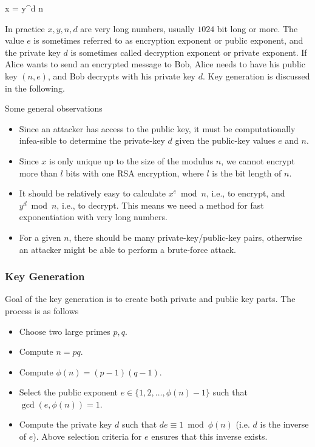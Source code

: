 \bee
x = y^d \bmod n
\eee

In practice $x, y, n, d$ are very long numbers, usually $1024$ bit long or more. The value $e$ is sometimes referred to as encryption exponent or public exponent, and the private key $d$ is sometimes called decryption exponent or private exponent. If Alice wants to send an encrypted message to Bob, Alice needs to have his public key $(n, e)$, and Bob decrypts with his private key $d$. Key generation is discussed in the following.

Some general observations

\begin{itemize}

\item Since an attacker has access to the public key, it must be computationally infea-sible to determine the private-key $d$ given the public-key values $e$ and $n$. 

\item Since $x$ is only unique up to the size of the modulus $n$, we cannot encrypt more than $l$ bits with one RSA encryption, where $l$ is the bit length of $n$.

\item It should be relatively easy to calculate $x^ e \bmod n$, i.e., to encrypt, and $y^d \bmod n$, i.e., to decrypt. This means we need a method for fast exponentiation with very long numbers.

\item For a given $n$, there should be many private-key/public-key pairs, otherwise an attacker might be able to perform a brute-force attack.

\end{itemize}


\subsubsection{Key Generation}

Goal of the key generation is to create both private and public key parts. The process is as follows

\begin{itemize}
	\item Choose two large primes $p,q$.

	\item Compute $n = pq$.

	\item Compute $\phi(n) =(p-1)(q-1)$.

	\item Select the public exponent $e \in \{1,2,\ldots,\phi(n)-1\}$ such that $\gcd(e,\phi(n))=1$.

	\item Compute the private key $d$ such that $de \equiv 1 \bmod \phi(n)$ (i.e. $d$ is the inverse of $e$). Above selection criteria for $e$ ensures that this inverse exists.

\end{itemize}
